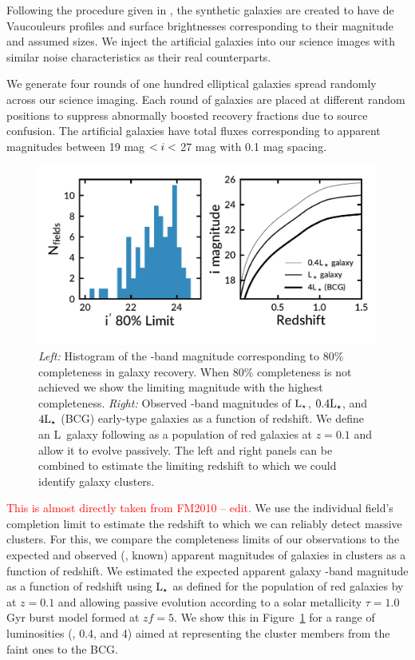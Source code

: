 \documentclass[apj, revtex4-1]{emulateapj}
\newcommand{\editorial}[1]{\textcolor{red}{#1}}
\begin{document}
Following the procedure given in \cite{Menanteau2010a}, the synthetic galaxies are created to have de Vaucouleurs \citep{DeVaucouleurs1948} profiles and surface brightnesses corresponding to their magnitude and assumed sizes. We inject the artificial galaxies into our science images with similar noise characteristics as their real counterparts.

We generate four rounds of one hundred elliptical galaxies spread randomly across our science imaging. Each round of galaxies are placed at different random positions to suppress abnormally boosted recovery fractions due to source confusion. The artificial galaxies have total fluxes corresponding to apparent magnitudes between 19 mag $< \hbox{$i$} <$ 27 mag with 0.1 mag spacing.

\begin{figure}
	\includegraphics[width=\textwidth]{figures/recovery_redshift.pdf}
	\caption{\textit{Left:} Histogram of the \sdssi-band magnitude corresponding to 80\% completeness in galaxy recovery. When 80\% completeness is not achieved we show the limiting magnitude with the highest completeness. \textit{Right:} Observed \sdssi-band magnitudes of $\hbox{L$_{\star}$}$, $0.4\hbox{L$_{\star}$}$, and $4\hbox{L$_{\star}$}$ (BCG) early-type galaxies as a function of redshift. We define an L\lstar\ galaxy following \cite{Blanton2003} as a population of red galaxies at $z = 0.1$ and allow it to evolve passively. The left and right panels can be combined to estimate the limiting redshift to which we could identify galaxy clusters.}
	\label{fig:recovery_redshift}
\end{figure}

\editorial{This is almost directly taken from FM2010 -- edit.} We use the individual field's completion limit to estimate the redshift to which we can reliably detect massive clusters. For this, we compare the completeness limits of our observations to the expected and observed (\ie, known) apparent magnitudes of galaxies in clusters as a function of redshift. We estimated the expected apparent galaxy \sdssi-band magnitude as a function of redshift using $\hbox{L$_{\star}$}$ as defined for the population of red galaxies by \cite{Blanton2003} at $z = 0.1$ and allowing passive evolution according to a solar metallicity \citep{Bruzual2003} $\tau = 1.0$ Gyr burst model formed at $zf = 5$. We show this in Figure~\ref{fig:recovery_redshift} for a range of luminosities (\lstar, 0.4\lstar, and 4\lstar) aimed at representing the cluster members from the faint ones to the BCG.
\end{document}
